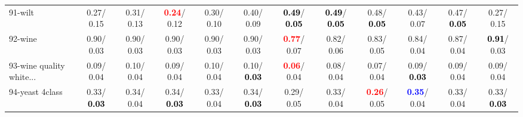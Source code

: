 \begin{table}[h]
\begin{center}
{\begin{tabular}{lc|c|c|c|c|c|c|c|c|c|c}
91-wilt &   0.27/  0.15 &   0.31/  0.13 & \textcolor{red}{\textbf{  0.24}}/  0.12 &   0.30/  0.10 &   0.40/  0.09 & \textcolor{black}{\textbf{  0.49}}/\textcolor{black}{\textbf{  0.05}} & \textcolor{black}{\textbf{  0.49}}/\textcolor{black}{\textbf{  0.05}} &   0.48/\textcolor{black}{\textbf{  0.05}} &   0.43/  0.07 &   0.47/\textcolor{black}{\textbf{  0.05}} &   0.27/  0.15 \\
92-wine &   0.90/  0.03 &   0.90/  0.03 &   0.90/  0.03 &   0.90/  0.03 &   0.90/  0.03 & \textcolor{red}{\textbf{  0.77}}/  0.07 &   0.82/  0.06 &   0.83/  0.05 &   0.84/  0.04 &   0.87/  0.04 & \textcolor{black}{\textbf{  0.91}}/  0.03 \\ \hline
93-wine quality white... &   0.09/  0.04 &   0.10/  0.04 &   0.09/  0.04 &   0.10/  0.04 &   0.10/\textcolor{black}{\textbf{  0.03}} & \textcolor{red}{\textbf{  0.06}}/  0.04 &   0.08/  0.04 &   0.07/  0.04 &   0.09/\textcolor{black}{\textbf{  0.03}} &   0.09/  0.04 &   0.09/  0.04 \\
94-yeast 4class &   0.33/\textcolor{black}{\textbf{  0.03}} &   0.34/  0.04 &   0.34/\textcolor{black}{\textbf{  0.03}} &   0.33/  0.04 &   0.34/\textcolor{black}{\textbf{  0.03}} &   0.29/  0.05 &   0.33/  0.04 & \textcolor{red}{\textbf{  0.26}}/  0.05 & \textcolor{blue}{\textbf{  0.35}}/  0.04 &   0.33/  0.04 &   0.33/\textcolor{black}{\textbf{  0.03}} \\\end{tabular}}\label{stratsALCKappa2aSVMRedux}
\end{center}
\end{table}
